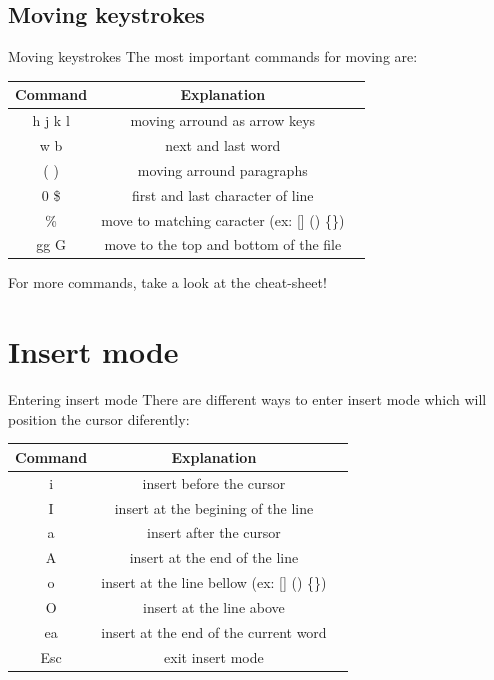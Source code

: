 \documentclass{beamer}
\begin{document}
  \subsection{Moving keystrokes}
  \begin{frame}{Moving keystrokes}
  The most important commands for moving are:
\begin{center}
\begin{tabular}{ |c|c|c| } 
 \hline
 Command & Explanation \\ \hline
 h j k l & moving arround as arrow keys \\ \hline
 w b & next and last word  \\ \hline
 ( ) & moving arround paragraphs \\ \hline
 0 \$ & first and last character of line \\ \hline
 \% & move to matching caracter (ex: [] () \{\}) \\ \hline
 gg G & move to the top and bottom of the file \\ \hline
\end{tabular}
\end{center}

For more commands, take a look at the cheat-sheet!
 \end{frame}

\section{Insert mode}
\begin{frame}{Entering insert mode}
     There are different ways to enter insert mode which will position the cursor diferently:
     \begin{center}
\begin{tabular}{ |c|c|c| } 
 \hline
 Command & Explanation \\ \hline
i & insert before the cursor \\ \hline
I & insert at the begining of the line \\ \hline
a & insert after the cursor \\ \hline
A & insert at the end of the line \\ \hline
o & insert at the line bellow (ex: [] () \{\}) \\ \hline
O & insert at the line above \\ \hline
ea & insert at the end of the current word \\ \hline
Esc & exit insert mode \\ \hline
\end{tabular}
\end{center}
 \end{frame}     
    
\end{document}

